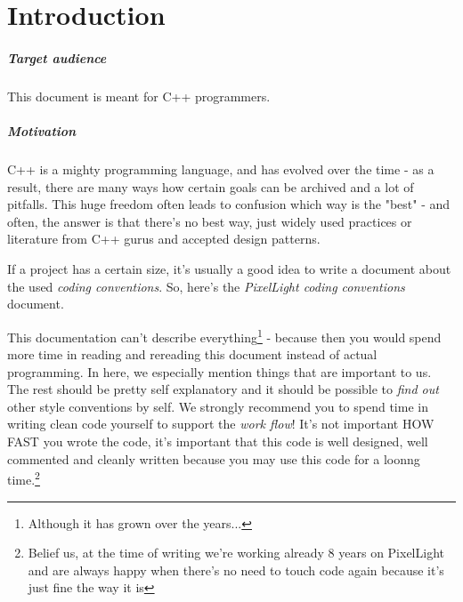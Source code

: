 \chapter{Introduction}


\paragraph{Target audience}
This document is meant for C++ programmers.


\paragraph{Motivation}
C++ is a mighty programming language, and has evolved over the time - as a result, there are many ways how certain goals can be archived and a lot of pitfalls. This huge freedom often leads to confusion which way is the "best" - and often, the answer is that there's no best way, just widely used practices or literature from C++ gurus and accepted design patterns.

If a project has a certain size, it's usually a good idea to write a document about the used \emph{coding conventions}. So, here's the \emph{PixelLight coding conventions} document.

This documentation can't describe everything\footnote{Although it has grown over the years...} - because then you would spend more time in reading and rereading this document instead of actual programming. In here, we especially mention things that are important to us. The rest should be pretty self explanatory and it should be possible to \emph{find out} other style conventions by self. We strongly recommend you to spend time in writing clean code yourself to support the \emph{work flow}! It's not important HOW FAST you wrote the code, it's important that this code is well designed, well commented and cleanly written because you may use this code for a loonng time.\footnote{Belief us, at the time of writing we're working already 8 years on PixelLight and are always happy when there's no need to touch code again because it's just fine the way it is}
